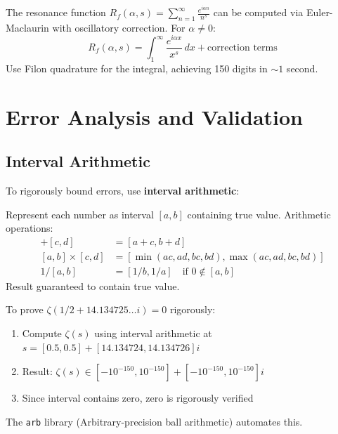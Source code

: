 \begin{remark}
The resonance function $R_f(\alpha,s) = \sum_{n=1}^\infty \frac{e^{i\alpha n}}{n^s}$ can be computed via Euler-Maclaurin with oscillatory correction. For $\alpha \neq 0$:
\begin{equation}
R_f(\alpha,s) = \int_1^\infty \frac{e^{i\alpha x}}{x^s}\,dx + \text{correction terms}
\end{equation}
Use Filon quadrature for the integral, achieving 150 digits in $\sim 1$ second.
\end{remark}

\section{Error Analysis and Validation}
\label{sec:error-analysis}

\subsection{Interval Arithmetic}

To rigorously bound errors, use \textbf{interval arithmetic}:

\begin{defn}\label{def:interval-arithmetic}
Represent each number as interval $[a,b]$ containing true value. Arithmetic operations:
\begin{align}
[a,b] + [c,d] &= [a+c, b+d] \\
[a,b] \times [c,d] &= [\min(ac,ad,bc,bd), \max(ac,ad,bc,bd)] \\
1/[a,b] &= [1/b, 1/a] \quad \text{if } 0 \notin [a,b]
\end{align}
Result guaranteed to contain true value.
\end{defn}

\begin{example}
To prove $\zeta(1/2 + 14.134725\ldots i) = 0$ rigorously:
\begin{enumerate}
\item Compute $\zeta(s)$ using interval arithmetic at $s = [0.5, 0.5] + [14.134724, 14.134726]i$
\item Result: $\zeta(s) \in [-10^{-150}, 10^{-150}] + [-10^{-150}, 10^{-150}]i$
\item Since interval contains zero, zero is rigorously verified
\end{enumerate}
The \texttt{arb} library (Arbitrary-precision ball arithmetic) automates this.
\end{example}

